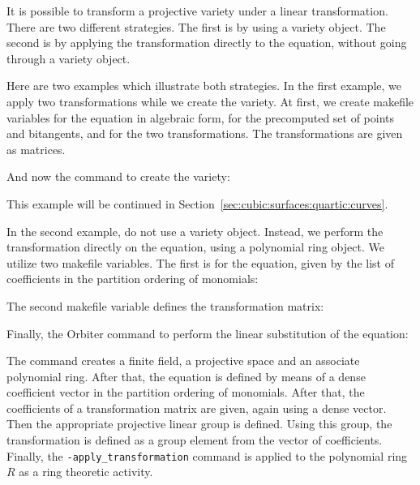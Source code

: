 

\bigskip


It is possible to transform a projective variety under a linear transformation. 
There are two different strategies. 
The first is by using a variety object. 
The second is by applying the transformation directly to the equation, 
without going through a variety object. 

\bigskip

Here are two examples which illustrate both strategies. 
In the first example, we apply two transformations while we create the variety.
At first, we create makefile variables for the equation in algebraic form, 
for the precomputed set of points and bitangents, and for the two transformations.
The transformations are given as matrices.







And now the command to create the variety:



This example will be continued in 
Section~\ref{sec:cubic:surfaces:quartic:curves}.


\bigskip



In the second example, do not use a variety object. 
Instead, we perform the transformation 
directly on the equation, using a polynomial ring object. 
We utilize two makefile variables. 
The first is for the equation, 
given by the list of coefficients in the partition ordering of monomials:



The second makefile variable defines the transformation matrix:


Finally, the Orbiter command to perform the linear substitution of the equation:





The command creates a finite field, a projective space and an associate polynomial ring. 
After that, the equation is defined by means of a dense coefficient vector in the partition ordering of monomials.
After that, the coefficients of a transformation matrix are given, again using a dense vector. 
Then the appropriate projective linear group is defined. 
Using this group, the transformation is defined as a group element 
from the vector of coefficients. 
Finally, the \verb'-apply_transformation' 
command is applied to the polynomial ring $R$ as a ring theoretic activity.


